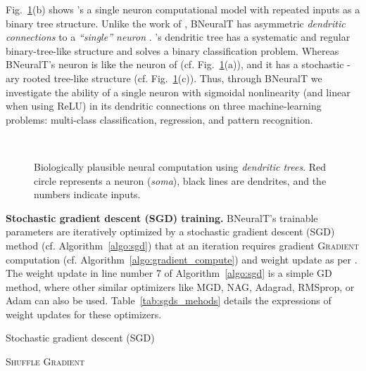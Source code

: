 \documentclass[11pt,a4paper]{article}
\begin{document}
    Fig.~\ref{fig:bio_trees}(b) shows \cite{jones2021might}'s a single neuron computational model with repeated inputs as a binary tree structure.  Unlike the work of \cite{poirazi2003pyramidal}, BNeuralT has asymmetric \textit{dendritic connections} to a \textit{``single'' neuron} \citep{beniaguev2020single,jones2021might}. \cite{jones2021might}'s dendritic tree has a systematic and regular binary-tree-like structure and solves a binary classification problem. Whereas BNeuralT's neuron is like the neuron of \cite{travis2005regional} (cf. Fig.~\ref{fig:bio_trees}(a)), and it has a stochastic -ary rooted tree-like structure (cf. Fig.~\ref{fig:bio_trees}(c)). Thus, through BNeuralT we investigate the ability of a single neuron with sigmoidal nonlinearity (and linear when using ReLU) in its dendritic connections on three machine-learning problems: multi-class classification, regression, and pattern recognition. \begin{figure}
        \centering
        \qquad~\quad
        \qquad~\quad
\caption{Biologically plausible neural computation using \textit{dendritic trees}. Red circle represents a neuron (\textit{soma}), black lines are dendrites, and the numbers indicate inputs.
            \label{fig:bio_trees}}
    \end{figure}
    
    \textbf{Stochastic gradient descent (SGD) training.}
    BNeuralT's trainable parameters  are iteratively optimized by a stochastic gradient descent (SGD) method (cf. Algorithm~\ref{algo:sgd}) that at an iteration  requires gradient  \textsc{Gradient} computation (cf. Algorithm~\ref{algo:gradient_compute}) and weight update as per . The weight update  in line number 7 of Algorithm~\ref{algo:sgd} is a simple GD method, where other similar optimizers like MGD, NAG, Adagrad, RMSprop, or Adam can also be used. Table~\ref{tab:sgds_mehods}  details the expressions of weight updates for these optimizers.  
\begin{algorithm}[h!]
        \caption{Stochastic gradient descent (SGD)}
        \label{algo:sgd}
        \begin{algorithmic}[1] 
             
            \State  {}
            \State  \textsc{Shuffle} 
            \State  \textsc{Gradient}   
            \State  {}
            \EndFor
            \EndFor    
            \EndProcedure  
        \end{algorithmic}
    \end{algorithm}
    
\end{document}
